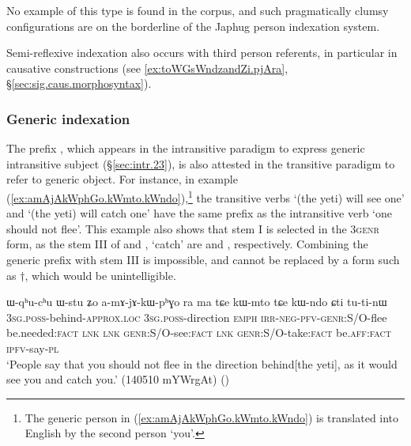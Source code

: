 No example of this type is found in the corpus, and  such pragmatically clumsy configurations are on the borderline of the  Japhug person indexation system.

Semi-reflexive indexation also occurs with third person referents, in particular in causative constructions (see \ref{ex:toWGsWndzandZi.pjAra}, §\ref{sec:sig.caus.morphosyntax}).
 
\subsubsection{Generic indexation} \label{sec:indexation.generic.tr}
The prefix , which appears in the intransitive paradigm to express generic intransitive subject (§\ref{sec:intr.23}), is also attested in the transitive paradigm to refer to generic object. For instance, in example (\ref{ex:amAjAkWphGo.kWmto.kWndo}),\footnote{The generic person in (\ref{ex:amAjAkWphGo.kWmto.kWndo}) is translated into English by the second person `you'. } the transitive verbs  `(the yeti) will see one' and  `(the yeti) will catch one' have the same  prefix as the intransitive verb  `one should not flee'. This example also shows that stem I is selected in the 3\fl{}\textsc{genr} form, as the stem III of  and , `catch' are  and , respectively. Combining the generic  prefix with stem III is impossible, and  cannot be replaced by a form such as $\dagger$, which would be unintelligible.

\begin{exe}
\ex   \label{ex:amAjAkWphGo.kWmto.kWndo}
\gll ɯ-qʰu-cʰu ɯ-stu ʑo a-mɤ-jɤ-kɯ-pʰɣo ra ma tɕe kɯ-mto tɕe kɯ-ndo ɕti tu-ti-nɯ \\
\textsc{3sg}.\textsc{poss}-behind-\textsc{approx}.\textsc{loc}  \textsc{3sg}.\textsc{poss}-direction \textsc{emph} \textsc{irr}-\textsc{neg}-\textsc{pfv}-\textsc{genr}:S/O-flee be.needed:\textsc{fact} \textsc{lnk} \textsc{lnk}
\textsc{genr}:S/O-see:\textsc{fact} \textsc{lnk} \textsc{genr}:S/O-take:\textsc{fact} be.\textsc{aff}:\textsc{fact} \textsc{ipfv}-say-\textsc{pl} \\
\glt `People say that you should not flee in the direction behind[the yeti], as it would see you and catch you.' (140510 mYWrgAt)
()
\end{exe}

